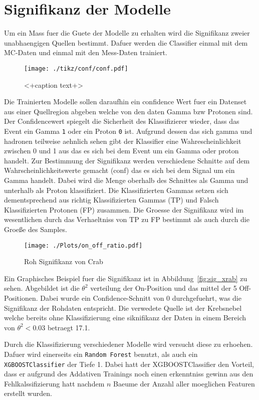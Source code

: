 \section{Signifikanz der Modelle}
Um ein Mass fuer die Guete der Modelle zu erhalten wird die Signifikanz zweier unabhaengigen Quellen bestimmt. 
Dafuer werden die Classifier einmal mit dem MC-Daten und einmal mit den Mess-Daten trainiert. 
\begin{figure}[H]
  \centering
  \texttt{[image: ./tikz/conf/conf.pdf]}
  \caption{<+caption text+>}
  \label{fig:<+label+>}
\end{figure}
Die Trainierten Modelle sollen daraufhin ein confidence Wert fuer ein Datenset aus einer Quellregion abgeben welche von den daten Gamma bzw Protonen sind. 
Der Confidencewert spiegelt die Sicherheit des Klassifizierer wieder, dass das Event ein Gamma \texttt{1} oder ein Proton \texttt{0} ist. 
Aufgrund dessen das sich gamma und hadronen teilweise aehnlich sehen gibt der Klassifier eine Wahrescheinlichkeit zwischen 0 und 1 aus das es sich bei dem Event um ein Gamma oder proton handelt.
Zur Bestimmung der Signifikanz werden verschiedene Schnitte auf dem Wahrscheinlichkeitswerte gemacht (conf) das es sich bei dem Signal um ein Gamma handelt.
Dabei wird die Menge oberhalb des Schnittes als Gamma und unterhalb als Proton klassifiziert. 
Die Klassifizierten Gammas setzen sich dementsprechend aus richtig Klassifizierten Gammas (TP) und Falsch Klassifizierten Protonen (FP) zusammen. 
Die Groesse der Signifikanz wird im wesentlichen durch das Verhaeltniss von TP zu FP bestimmt als auch durch die Groeße des Samples.

\begin{figure}
  \centering
  \texttt{[image: ./Plots/on\_off\_ratio.pdf]}
  \caption{Roh Signifikanz von Crab}
  \label{fig:sig_crab}
\end{figure}
Ein Graphisches Beispiel fuer die Signifikanz ist in Abbildung~\ref{fig:sig_xrab} zu sehen. 
Abgebildet ist die $\theta^{2}$ verteilung der On-Position und das mittel der 5 Off-Positionen.
Dabei wurde ein Confidence-Schnitt von 0 durchgefuehrt, was die Signifikanz der Rohdaten entspricht.
Die verwedete Quelle ist der Krebsnebel welche bereits ohne Klassifizierung eine siknifikanz der Daten in einem Bereich von $\theta^{2} < 0.03$ betraegt \SI{17,1}{\sigma}.

Durch die Klassifizierung verschiedener Modelle wird versucht diese zu erhoehen. Dafuer wird einerseits ein \texttt{Random Forest} benutzt, als auch ein \texttt{XGBOOSTClassifier} der Tiefe 1. Dabei hatt der XGBOOSTClassifier den Vorteil, dass er aufgrund des Addativen Trainings noch einen erkenntniss gewinn aus den Fehlkalssifizierung hatt nachdem $n$ Baeume der Anzahl aller moeglichen Featuren erstellt wurden.

